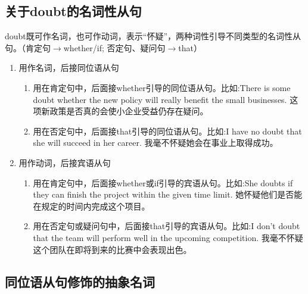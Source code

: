 \subsection{关于doubt的名词性从句}

doubt既可作名词，也可作动词，表示“怀疑”，两种词性引导不同类型的名词性从句。（肯定句\(\rightarrow\)whether/if; 否定句、疑问句\(\rightarrow\)that）
\begin{enumerate}
  \item 用作名词，后接同位语从句
        \begin{enumerate}
          \item 用在肯定句中，后面接whether引导的同位语从句。比如:There is some doubt whether the new policy will really benefit the small businesses. 这项新政策是否真的会使小企业受益仍存在疑问。
          \item 用在否定句中，后面接that引导的同位语从句。比如:I have no doubt that she will succeed in her career. 我毫不怀疑她会在事业上取得成功。
        \end{enumerate}
  \item 用作动词，后接宾语从句
        \begin{enumerate}
          \item 用在肯定句中，后面接whether或if引导的宾语从句。比如:She doubts if they can finish the project within the given time limit. 她怀疑他们是否能在规定的时间内完成这个项目。
          \item 用在否定句或疑问句中，后面接that引导的宾语从句。比如:I don't doubt that the team will perform well in the upcoming competition. 我毫不怀疑这个团队在即将到来的比赛中会表现出色。
        \end{enumerate}
\end{enumerate}

\subsection{同位语从句修饰的抽象名词}

